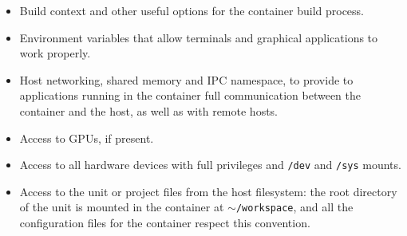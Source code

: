 \begin{itemize}
  \item Build context and other useful options for the container build process.
  \item Environment variables that allow terminals and graphical applications to work properly.
  \item Host networking, shared memory and IPC namespace, to provide to applications running in the container full communication between the container and the host, as well as with remote hosts.
  \item Access to GPUs, if present.
  \item Access to all hardware devices with full privileges and \texttt{/dev} and \texttt{/sys} mounts.
  \item Access to the unit or project files from the host filesystem: the root directory of the unit is mounted in the container at \texttt{$\sim$/workspace}, and all the configuration files for the container respect this convention.
\end{itemize}
